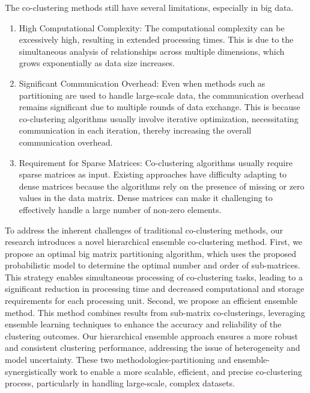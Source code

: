 The co-clustering methods still have several limitations, especially in big data.

\begin{enumerate}
    \item High Computational Complexity: The computational complexity can be excessively high, resulting in extended processing times. This is due to the simultaneous analysis of relationships across multiple dimensions, which grows exponentially as data size increases.
    \item Significant Communication Overhead: Even when methods such as partitioning are used to handle large-scale data, the communication overhead remains significant due to multiple rounds of data exchange. This is because co-clustering algorithms usually involve iterative optimization, necessitating communication in each iteration, thereby increasing the overall communication overhead.
    \item Requirement for Sparse Matrices: Co-clustering algorithms usually require sparse matrices as input. Existing approaches have difficulty adapting to dense matrices because the algorithms rely on the presence of missing or zero values in the data matrix. Dense matrices can make it challenging to effectively handle a large number of non-zero elements.
\end{enumerate}

To address the inherent challenges of traditional co-clustering methods, our research introduces a novel hierarchical ensemble co-clustering method. First,  we propose an optimal big matrix partitioning algorithm, which uses the proposed probabilistic model to determine the optimal number and order of sub-matrices. This strategy enables simultaneous processing of co-clustering tasks, leading to a significant reduction in processing time and decreased computational and storage requirements for each processing unit.
Second, we propose an efficient ensemble method. This method combines results from sub-matrix co-clusterings, leveraging ensemble learning techniques to enhance the accuracy and reliability of the clustering outcomes. Our hierarchical ensemble approach ensures a more robust and consistent clustering performance, addressing the issue of heterogeneity and model uncertainty.
These two methodologies-partitioning and ensemble-synergistically work to enable a more scalable, efficient, and precise co-clustering process, particularly in handling large-scale, complex datasets.

